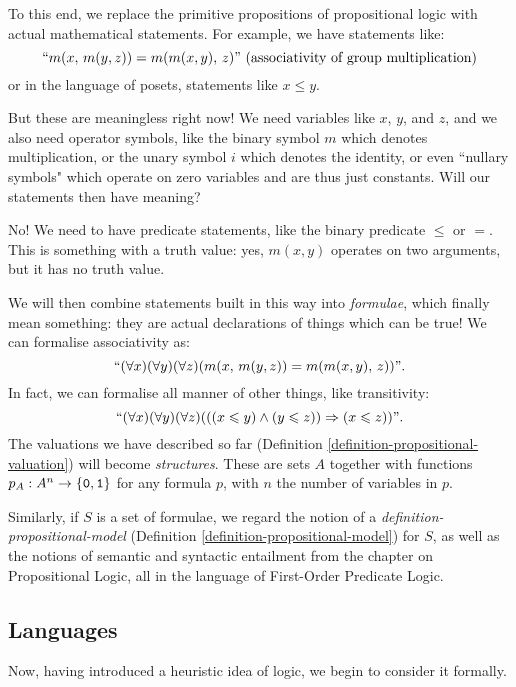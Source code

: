 \documentclass{article}
\begin{document}
To this end, we replace the primitive propositions of propositional logic with actual mathematical statements. For example, we have statements like:
\[
``m(x, \, m(y, z)) = m(m(x, y), \, z)" \text{ (associativity of group multiplication)}
\]
or in the language of posets, statements like $x \leq y$.

But these are meaningless right now! We need variables like $x$, $y$, and $z$, and we also need operator symbols, like the binary symbol $m$ which denotes multiplication, or the unary symbol $i$ which denotes the identity, or even ``nullary symbols" which operate on zero variables and are thus just constants. Will our statements then have meaning?

No!  We need to have predicate statements, like the binary predicate $\leq$ or $=$. This is something with a truth value: yes, $m(x, y)$ operates on two arguments, but it has no truth value.

We will then combine statements built in this way into \textit{formulae}, which finally mean something: they are actual declarations of things which can be true! We can formalise associativity as:
\[
``(\forall x)(\forall y)(\forall z)(m(x, \, m(y, z)) = m(m(x, y), \, z))".
\]
In fact, we can formalise all manner of other things, like transitivity:
\[
``(\forall x)(\forall y)(\forall z)(((x \leqslant y) \land (y \leqslant z)) \Rightarrow (x \leqslant z))".
\]
The valuations we have described so far (Definition \ref{definition-propositional-valuation}) will become \textit{structures}. These are sets $A$ together with functions $p_A: A^n \to \left\lbrace \texttt{0}, \texttt{1} \right\rbrace$ for any formula $p$, with $n$ the number of variables in $p$.

Similarly, if $S$ is a set of formulae, we regard the notion of a \textit{definition-propositional-model} (Definition \ref{definition-propositional-model}) for $S$, as well as the notions of semantic and syntactic entailment from the chapter on Propositional Logic, all in the language of First-Order Predicate Logic.


\subsection{Languages}
\label{section-first-order-language}

Now, having introduced a heuristic idea of logic, we begin to consider it formally.
\end{document}
